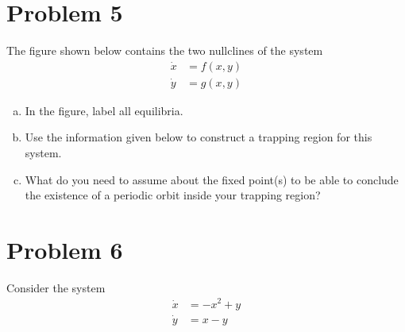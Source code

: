 \documentclass[12pt]{article}
\begin{document}
\pagebreak

\section{Problem 5}
The figure shown below contains the two nullclines of the system
\begin{align*}
    \dot x & = f(x,y) \\
    \dot y & = g(x,y)
\end{align*}

\begin{center}
\end{center}

\begin{enumerate}[(a)]
    \item In the figure, label all equilibria.
    \item Use the information given below to construct a trapping region for this system.
    \item What do you need to assume about the fixed point(s) to be able to conclude the existence of a
          periodic orbit inside your trapping region?
\end{enumerate}


\pagebreak
\section{Problem 6}
Consider the system
\begin{align*}
    \dot x & = -x^2 + y \\
    \dot y & = x- y
\end{align*}
\end{document}
